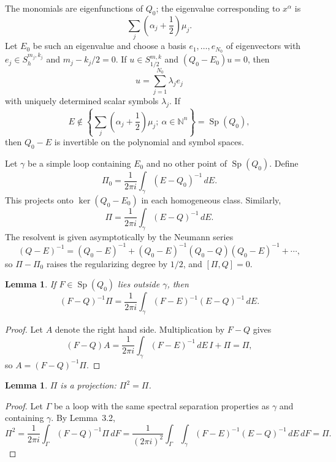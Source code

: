 \documentclass[11pt,a4paper]{article}
\newcommand{\N}{\mathbb N}
\newcommand{\Sp}{\operatorname{Sp}}
\numberwithin{equation}{section}
\newtheorem{lemma}[theorem]{Lemma}
\theoremstyle{remark}
\begin{document}
The monomials are eigenfunctions of $Q_0$; the eigenvalue corresponding to $x^\alpha$ is
\[
\sum_j\left(\alpha_j+\frac12\right)\mu_j.
\]
Let $E_0$ be such an eigenvalue and choose a basis $e_1,\ldots,e_{N_0}$ of eigenvectors with $e_j\in S_h^{m_j,k_j}$ and $m_j-k_j/2=0$. If $u\in S_{1/2}^{m,k}$ and $(Q_0-E_0)u=0$, then
\[
u=\sum_{j=1}^{N_0}\lambda_j e_j
\]
with uniquely determined scalar symbols $\lambda_j$. If
\[
E\notin\left\{\sum_j\left(\alpha_j+\frac12\right)\mu_j;\ \alpha\in\N^n\right\}=\Sp(Q_0),
\]
then $Q_0-E$ is invertible on the polynomial and symbol spaces.

Let $\gamma$ be a simple loop containing $E_0$ and no other point of $\Sp(Q_0)$. Define
\begin{equation}
\Pi_0=\frac1{2\pi i}\int_\gamma(E-Q_0)^{-1}\,dE.
\end{equation}
This projects onto $\ker(Q_0-E_0)$ in each homogeneous class. Similarly,
\begin{equation}
\Pi=\frac1{2\pi i}\int_\gamma(E-Q)^{-1}\,dE.
\end{equation}
The resolvent is given asymptotically by the Neumann series
\[
(Q-E)^{-1}=(Q_0-E)^{-1}+(Q_0-E)^{-1}(Q_0-Q)(Q_0-E)^{-1}+\cdots,
\]
so $\Pi-\Pi_0$ raises the regularizing degree by $1/2$, and $[\Pi,Q]=0$.

\begin{lemma}
If $F\in\Sp(Q_0)$ lies outside $\gamma$, then
\begin{equation}
(F-Q)^{-1}\Pi=\frac1{2\pi i}\int_\gamma
(F-E)^{-1}(E-Q)^{-1}\,dE.
\end{equation}
\end{lemma}
\begin{proof}
Let $A$ denote the right hand side. Multiplication by $F-Q$ gives
\[
(F-Q)A=\frac1{2\pi i}\int_\gamma(F-E)^{-1}\,dE\,I+\Pi=\Pi,
\]
so $A=(F-Q)^{-1}\Pi$.
\end{proof}

\begin{lemma}
$\Pi$ is a projection: $\Pi^2=\Pi$.
\end{lemma}
\begin{proof}
Let $\Gamma$ be a loop with the same spectral separation properties as $\gamma$ and containing $\gamma$. By Lemma~3.2,
\[
\Pi^2=\frac1{2\pi i}\int_\Gamma(F-Q)^{-1}\Pi\,dF
=\frac1{(2\pi i)^2}\int_\Gamma\int_\gamma
(F-E)^{-1}(E-Q)^{-1}\,dE\,dF=\Pi.
\]
\end{proof}
\end{document}
